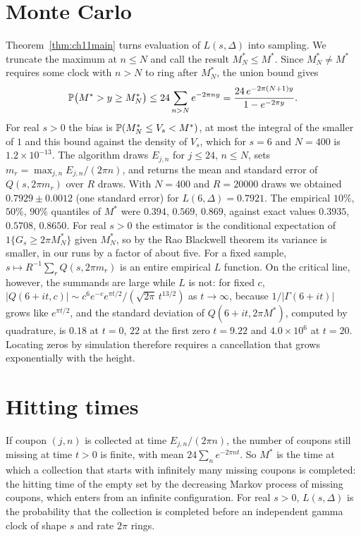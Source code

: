 \section{Monte Carlo}

Theorem~\ref{thm:ch11main} turns evaluation of $L(s,\Delta)$ into sampling. We truncate the maximum at $n\le N$ and call the result $M^*_N\le M^*$. Since $M^*_N\ne M^*$ requires some clock with $n>N$ to ring after $M^*_N$, the union bound gives
\[
\mathbb{P}\bigl(M^*>y\ge M^*_N\bigr)\le24\sum_{n>N}e^{-2\pi ny}=\frac{24\,e^{-2\pi(N+1)y}}{1-e^{-2\pi y}} .
\]
For real $s>0$ the bias is $\mathbb{P}(M^*_N\le V_s<M^*)$, at most the integral of the smaller of $1$ and this bound against the density of $V_s$, which for $s=6$ and $N=400$ is $1.2\times10^{-13}$. The algorithm draws $E_{j,n}$ for $j\le24$, $n\le N$, sets $m_r=\max_{j,n}E_{j,n}/(2\pi n)$, and returns the mean and standard error of $Q(s,2\pi m_r)$ over $R$ draws. With $N=400$ and $R=20000$ draws we obtained $0.7929\pm0.0012$ (one standard error) for $L(6,\Delta)=0.7921$. The empirical $10\%$, $50\%$, $90\%$ quantiles of $M^*$ were $0.394$, $0.569$, $0.869$, against exact values $0.3935$, $0.5708$, $0.8650$. For real $s>0$ the estimator is the conditional expectation of $1\{G_s\ge2\pi M^*_N\}$ given $M^*_N$, so by the Rao Blackwell theorem its variance is smaller, in our runs by a factor of about five. For a fixed sample, $s\mapsto R^{-1}\sum_rQ(s,2\pi m_r)$ is an entire empirical $L$ function. On the critical line, however, the summands are large while $L$ is not: for fixed $c$, $|Q(6+it,c)|\sim c^6e^{-c}e^{\pi t/2}/(\sqrt{2\pi}\,t^{13/2})$ as $t\to\infty$, because $1/|\Gamma(6+it)|$ grows like $e^{\pi t/2}$, and the standard deviation of $Q(6+it,2\pi M^*)$, computed by quadrature, is $0.18$ at $t=0$, $22$ at the first zero $t=9.22$ and $4.0\times10^6$ at $t=20$. Locating zeros by simulation therefore requires a cancellation that grows exponentially with the height.

\section{Hitting times}

If coupon $(j,n)$ is collected at time $E_{j,n}/(2\pi n)$, the number of coupons still missing at time $t>0$ is finite, with mean $24\sum_ne^{-2\pi nt}$. So $M^*$ is the time at which a collection that starts with infinitely many missing coupons is completed: the hitting time of the empty set by the decreasing Markov process of missing coupons, which enters from an infinite configuration. For real $s>0$, $L(s,\Delta)$ is the probability that the collection is completed before an independent gamma clock of shape $s$ and rate $2\pi$ rings.

